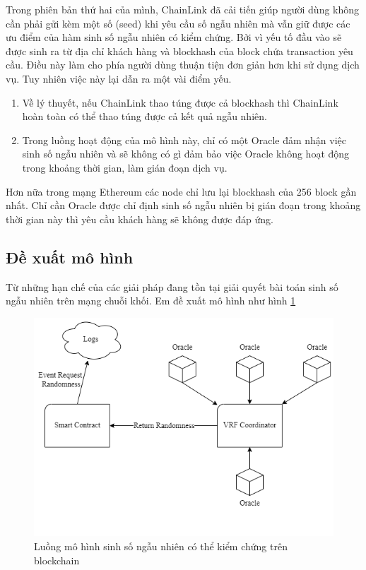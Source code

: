 \documentclass[../main.tex]{subfiles}
\begin{document}
Trong phiên bản thứ hai của mình, ChainLink đã cải tiến giúp người dùng không cần phải gửi kèm một số (seed) khi yêu cầu số ngẫu nhiên mà vẫn giữ được các ưu điểm của hàm sinh số ngẫu nhiên có kiểm chứng. Bởi vì  yếu tố đầu vào sẽ được sinh ra từ địa chỉ khách hàng và blockhash của block chứa transaction yêu cầu. Điều này làm cho phía người dùng thuận tiện đơn giản hơn khi sử dụng dịch vụ. Tuy nhiên việc này lại dẫn ra một vài điểm yếu. 
\begin{enumerate}
 \item Về lý thuyết, nếu ChainLink thao túng được cả blockhash thì ChainLink hoàn toàn có thể thao túng được cả kết quả ngẫu nhiên. 
 \item Trong luồng hoạt động của mô hình này, chỉ có một Oracle đảm nhận việc sinh số ngẫu nhiên và sẽ không có gì đảm bảo việc Oracle không hoạt động trong khoảng thời gian, làm gián đoạn dịch vụ.
\end{enumerate}

Hơn nữa trong mạng Ethereum các node chỉ lưu lại blockhash của 256 block gần nhất. Chỉ cần Oracle được chỉ định sinh số ngẫu nhiên bị gián đoạn trong khoảng thời gian này thì yêu cầu khách hàng sẽ không được đáp ứng.



\subsection{Đề xuất mô hình}
Từ những hạn chế của các giải pháp đang tồn tại giải quyết bài toán sinh số ngẫu nhiên trên mạng chuỗi khối. Em đề xuất mô hình như hình \ref{fig:flow} 

\begin{figure}[h!]
    \centering
    \includegraphics[scale = 0.5]{Figure/flow.png}
    \caption{Luồng mô hình sinh số ngẫu nhiên có thể kiểm chứng trên blockchain}
    \label{fig:flow}
\end{figure}
\end{document}
